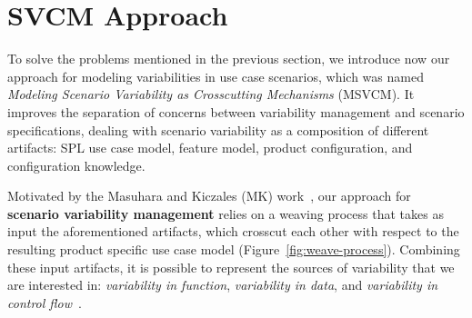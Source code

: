 \documentclass{sig-alternate}
\begin{document}
%


\section{SVCM Approach}
\label{sec:svmc}

To solve the problems mentioned in the previous section, we introduce now our
approach for modeling variabilities in use case scenarios, which was named
\emph{Modeling Scenario Variability as Crosscutting Mechanisms} (MSVCM). It
improves the separation of concerns between variability management and scenario
specifications, dealing with scenario variability as a composition of different
artifacts: SPL use case model, feature model, product configuration,
and configuration knowledge.

Motivated by the Masuhara and Kiczales (MK) work~\cite{Masuhara:2003aa}, our
approach for \textbf{scenario variability management} relies on a weaving
process that takes as input the aforementioned artifacts, which crosscut
each other with respect to the resulting product specific use case model
(Figure~\ref{fig:weave-process}). Combining these input artifacts, it is possible
to represent the sources of variability that we are interested in:
\emph{variability in function}, \emph{variability in data}, and \emph{variability in
control flow}~\cite{Bachmann:2001aa}.
\end{document}
